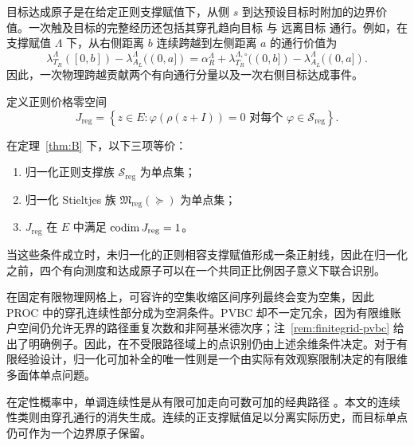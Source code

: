目标达成原子是在给定正则支撑赋值下，从侧 $s$ 到达预设目标时附加的边界价值。一次触及目标的完整经历还包括其穿孔趋向目标 与 远离目标 通行。例如，在支撑赋值 $\Lambda$ 下，从右侧距离 $b$ 连续跨越到左侧距离 $a$ 的通行价值为
\[
 \lambda_{T_R}^{\Lambda}([0,b])-\lambda_{A_L}^{\Lambda}((0,a])
 =\alpha_R^{\Lambda}+\lambda_{T_R}^{\Lambda,\circ}((0,b])-\lambda_{A_L}^{\Lambda}((0,a]).
\]
因此，一次物理跨越贡献两个有向通行分量以及一次右侧目标达成事件。

定义正则价格零空间
\[
 J_{\mathrm{reg}}
 =\left\{z\in E:
 \varphi\!\left(\rho(z+I)\right)=0
 \text{ 对每个 }\varphi\in\mathcal S_{\mathrm{reg}}
 \right\}.
\]

\begin{corollary}[一个共同标量化的点识别]\label{cor:common-scale}
在定理~\ref{thm:B} 下，以下三项等价：
\begin{enumerate}
 \item 归一化正则支撑族 $\mathcal S_{\mathrm{reg}}$ 为单点集；
 \item 归一化 Stieltjes 族 $\mathfrak M_{\mathrm{reg}}(\succeq)$ 为单点集；
 \item $J_{\mathrm{reg}}$ 在 $E$ 中满足 $\operatorname{codim} J_{\mathrm{reg}}=1$。
\end{enumerate}
当这些条件成立时，未归一化的正则相容支撑赋值形成一条正射线，因此在归一化之前，四个有向测度和达成原子可以在一个共同正比例因子意义下联合识别。
\end{corollary}

在固定有限物理网格上，可容许的空集收缩区间序列最终会变为空集，因此 PROC 中的穿孔连续性部分成为空洞条件。PVBC 却不一定冗余，因为有限维账户空间仍允许无界的路径重复次数和非阿基米德次序；注~\ref{rem:finitegrid-pvbc} 给出了明确例子。因此，在不受限路径域上的点识别仍由上述余维条件决定。对于有限经验设计，归一化可加补全的唯一性则是一个由实际有效观察限制决定的有限维多面体单点问题。

在定性概率中，单调连续性是从有限可加走向可数可加的经典路径 \citep{Villegas1964,ChateauneufJaffray1984}。本文的连续性类则由穿孔通行的消失生成。连续的正支撑赋值足以分离实际历史，而目标单点仍可作为一个边界原子保留。
